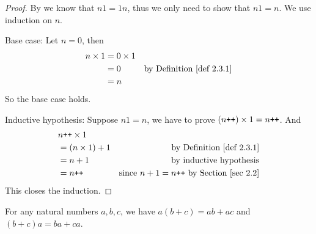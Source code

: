 \begin{proof}
By  we know that \(n1 = 1n\), thus we only need to show that \(n1 = n\).
We use induction on \(n\).

Base case: Let \(n=0\), then
\begin{align*}
    n \X 1 & = 0 \X 1 \\
           & = 0 & \text{by \DEF{2.3.1}} \\
           & = n
\end{align*}
So the base case holds.

Inductive hypothesis: Suppose \(n1 = n\), we have to prove \((n\texttt{++}) \times 1 = n\texttt{++}\). And
\begin{align*}
    & n\INC \X 1 \\
    & = (n \X 1) + 1 & \text{by \DEF{2.3.1}} \\
    & = n + 1 & \text{by inductive hypothesis} \\
    & = n\INC & \text{since \(n + 1 = n\INC\) by Section \ref{sec 2.2}}
\end{align*}
This closes the induction.
\end{proof}

\begin{proposition}\label{prop 2.3.4}
For any natural numbers \(a, b, c\), we have \(a(b + c)= ab + ac\) and \((b + c)a = ba + ca\).
\end{proposition}

